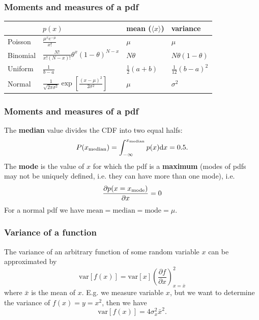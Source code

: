 \begin{frame}

\frametitle{Moments and measures of a pdf}
\label{momentsandmeasuresofapdf}

\begin{table}[htbp]
\begin{minipage}{\linewidth}
\setlength{\tymax}{0.5\linewidth}
\centering
\small
\begin{tabulary}{\textwidth}{@{}LLLL@{}} \toprule
&$p(x)$&mean ($\langle x \rangle$)&variance\\
\midrule
Poisson&$\frac{\mu^x e^{-\mu}}{x!}$&$\mu$&$\mu$\\
Binomial&$\frac{N!}{x!(N-x)!}\theta^x(1-\theta)^{N-x}$&$N\theta$&$N\theta(1-\theta)$\\
Uniform&$\frac{1}{b-a}$&$\frac{1}{2}(a+b)$&$\frac{1}{12}(b-a)^2$\\
Normal&$\frac{1}{\sqrt{2\pi\sigma^2}}\exp{\left[\frac{(x-\mu)^2}{2\sigma^2}\right]}$&$\mu$&$\sigma^2$\\

\bottomrule

\end{tabulary}
\end{minipage}
\end{table}

\end{frame}

\begin{frame}

\frametitle{Moments and measures of a pdf}
\label{momentsandmeasuresofapdf}

The \textbf{median} value divides the CDF into two equal halfs:
\[
P(x_{\rm median}) = \int_{-\infty}^{x_{\rm median}} p(x) {\rm d}x = 0.5.
\]
The \textbf{mode} is the value of $x$ for which the pdf is a \textbf{maximum} (modes of pdfs may not be
uniquely defined, i.e. they can have more than one mode), i.e.
\[
\frac{\partial p(x=x_{\rm mode})}{\partial x} = 0
\]
For a normal pdf we have $\text{mean} = \text{median} = \text{mode} = \mu$.

\end{frame}

\begin{frame}

\frametitle{Variance of a function}
\label{varianceofafunction}

The variance of an arbitrary function of some random variable $x$ can be approximated by
\[
\boxed{\text{var}[f(x)] = \text{var}[x]\left(\frac{\partial f}{\partial x}\right)^2_{x=\bar{x}}}
\]
where $\bar{x}$ is the mean of $x$. E.g. we measure variable $x$, but we want to determine the
variance of $f(x) = y = x^2$, then we have
\[
\text{var}[f(x)] = 4\sigma^2_x \bar{x}^2. 
\]

\end{frame}

